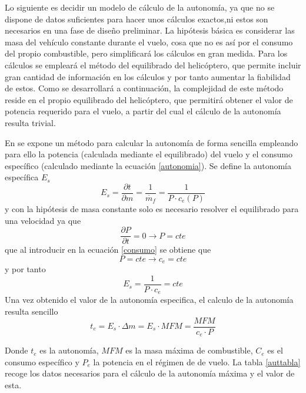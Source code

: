Lo siguiente es decidir un modelo de cálculo de la autonomía, ya que no se dispone de datos suficientes para hacer unos cálculos exactos,ni estos son necesarios en una fase de diseño preliminar. La hipótesis básica es considerar las masa del vehículo constante durante el vuelo, cosa que no es así por el consumo del propio combustible, pero simplificará los cálculos en gran medida.
Para los cálculos se empleará el método del equilibrado del helicóptero, que permite incluir gran cantidad de información en los cálculos y por tanto aumentar la fiabilidad de estos. Como se desarrollará a continuación, la complejidad de este método reside en el propio equilibrado del helicóptero, que permitirá obtener el valor de potencia requerido para el vuelo, a partir del cual el cálculo de la autonomía resulta trivial.

En \citet{Filippone} se expone un método para calcular la autonomía de forma sencilla empleando para ello la potencia (calculada mediante el equilibrado) del vuelo y el consumo específico (calculado mediante la ecuación \ref{autonomia}).
Se define la autonomía específica $E_s$
\begin{equation}
	E_s=\frac{\partial t}{\partial m}=\frac{1}{\dot{m_f}}=\frac{1}{P\cdot c_{e}(P)}
	\label{autespecifica}
\end{equation}
y con la hipótesis de masa constante solo es necesario resolver el equilibrado para una velocidad ya que
\begin{equation}
	\frac{\partial P}{\partial t}=0\rightarrow P=cte
\end{equation}
que al introducir en la ecuación \ref{consumo} se obtiene que
\begin{equation}
	P=cte\rightarrow c_e=cte
\end{equation}
y por tanto
\begin{equation}
E_s=\frac{1}{P\cdot c_{e}}=cte
\label{autespecificacte}
\end{equation}
Una vez obtenido el valor de la autonomía especifica, el calculo de la autonomía resulta sencillo
\begin{equation}
	t_{e}=E_s\cdot \Delta m=E_s\cdot MFM=\frac{MFM}{c_e\cdot P}
	\label{autonomia}
\end{equation}

Donde $t_e$ es la autonomía, $MFM$ es la masa máxima de combustible, $C_{e}$ es el consumo específico y $P_e$ la potencia en el régimen de de vuelo.
La tabla \ref{auttabla} recoge los datos necesarios para el cálculo de la autonomía máxima y el valor de esta.


